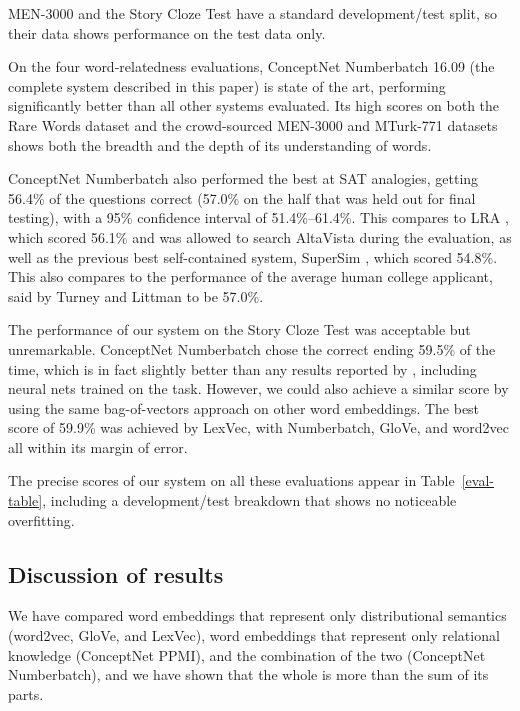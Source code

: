 \documentclass[letterpaper]{article}
\begin{document}
MEN-3000 and the Story Cloze Test have a standard development/test split, so
their data shows performance on the test data only.

On the four word-relatedness evaluations, ConceptNet Numberbatch 16.09 (the
complete system described in this paper) is state of the art, performing
significantly better than all other systems evaluated. Its high scores on both
the Rare Words dataset and the crowd-sourced MEN-3000 and MTurk-771 datasets
shows both the breadth and the depth of its understanding of words.

ConceptNet Numberbatch also performed the best at SAT analogies, getting 56.4\%
of the questions correct (57.0\% on the half that was held out for final
testing), with a 95\% confidence interval of 51.4\%--61.4\%.
This compares to LRA \cite{turney2005lra}, which scored 56.1\% and was
allowed to search AltaVista during the evaluation, as well as the previous best
self-contained system, SuperSim \cite{turney2013supersim}, which scored 54.8\%.
This also compares to the performance of the average human college applicant,
said by Turney and Littman to be 57.0\%.

The performance of our system on the Story Cloze Test was acceptable but
unremarkable.  ConceptNet Numberbatch chose the correct ending 59.5\% of the
time, which is in fact slightly better than any results reported by
\citeauthor{mostafazadeh2016cloze} \citeyear{mostafazadeh2016cloze}, including
neural nets trained on the task. However, we could also achieve a similar score
by using the same bag-of-vectors approach on other word embeddings. The best
score of 59.9\% was achieved by LexVec, with Numberbatch, GloVe, and word2vec
all within its margin of error.

The precise scores of our system on all these evaluations appear in
Table~\ref{eval-table}, including a development/test breakdown that shows no
noticeable overfitting.


\subsection{Discussion of results}

We have compared word embeddings that represent only distributional semantics
(word2vec, GloVe, and LexVec), word embeddings that represent only relational
knowledge (ConceptNet PPMI), and the combination of the two (ConceptNet
Numberbatch), and we have shown that the whole is more than the sum of its
parts.
\end{document}
